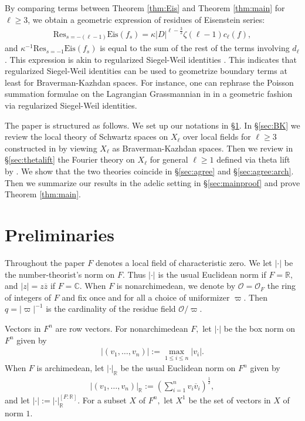 \documentclass[11pt,a4paper,reqno]{amsart}
\theoremstyle{remark}
\numberwithin{equation}{section}
\newcommand{\OO}{\mathcal{O}}
\newcommand{\CC}{\mathbb{C}}
\newcommand{\RR}{\mathbb{R}}
\theoremstyle{definition}
\renewcommand{\bar}{\overline}
\numberwithin{equation}{section}
\begin{document}
By comparing terms between Theorem \ref{thm:Eis} and Theorem \ref{thm:main} for $\ell\ge 3$, we obtain a geometric expression of residues of Eisenstein series:
\begin{align*}
    \mathrm{Res}_{s=-(\ell-1)} \mathrm{Eis}(f_{s})=\kappa|D|^{\ell-\frac{3}{2}}\zeta(\ell-1)c_\ell(f),
\end{align*}
and $\kappa^{-1}\mathrm{Res}_{s=-1}\mathrm{Eis}(f_{s})$ is equal to the sum of the rest of the terms involving $d_\ell$. This expression is akin to regularized Siegel-Weil identities \cite{Ichino:SW,Ikeda:SW,KR:Siegel-Weil}. This indicates that regularized Siegel-Weil identities can be used to geometrize boundary terms at least for Braverman-Kazhdan spaces. For instance, one can rephrase the Poisson summation formulae on the Lagrangian Grassmannian in \cite{Getz:Liu:BK} in a geometric fashion via regularized Siegel-Weil identities. 

The paper is structured as follows. We set up our notations in \S \ref{sec:prelim}. In \S \ref{sec:BK}  we review the local theory of Schwartz spaces on $X_\ell$ over local fields for $\ell\ge 3$ constructed in \cite{Getz:Hsu:Leslie} by viewing $X_\ell$ as Braverman-Kazhdan spaces. Then we review in \S\ref{sec:thetalift} the Fourier theory on $X_\ell$ for general $\ell\ge 1$ defined via theta lift by \cite{Getz:Quad}. We show that the two theories coincide in \S \ref{sec:agree} and \S \ref{sec:agree:arch}. Then we summarize our results in the adelic setting in \S \ref{sec:mainproof} and prove Theorem \ref{thm:main}.

\section{Preliminaries}\label{sec:prelim}

Throughout the paper $F$ denotes a local field of characteristic zero. We let $|\cdot|$ be the number-theorist's norm on $F$. Thus $|\cdot|$ is the usual Euclidean norm if $F=\RR,$ and $|z|=z\bar{z}$ if $F=\CC$. When $F$ is nonarchimedean, we denote by $\OO=\OO_F$ the ring of integers of $F$ and fix once and for all a choice of uniformizer $\varpi$. Then $q=|\varpi|^{-1}$ is the cardinality of the residue field $\OO/\varpi$. 

Vectors in $F^n$ are row vectors. For nonarchimedean $F,$ let $|\cdot|$ be the box norm on $F^n$ given by
\begin{align*}
    |(v_1,\ldots,v_n)|:=\max_{1\le i\le n} |v_i|.
\end{align*}
When $F$ is archimedean, let $|\cdot|_\RR$ be the usual Euclidean norm on $F^n$ given by
\begin{align*}
     |(v_1,\ldots,v_n)|_\RR:=\left(\sum_{i=1}^n v_i\overline{v}_i\right)^{\frac{1}{2}},
\end{align*}
and let $|\cdot|:=|\cdot|_{\RR}^{[F:\RR]}.$ For a subset $X$ of $F^n,$ let $X^1$ be the set of vectors in $X$ of norm $1$. 
\end{document}

